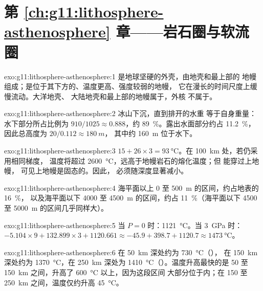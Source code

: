 \section*{第 \ref{ch:g11:lithosphere-asthenosphere} 章——岩石圈与软流圈}

\begin{solution}{exo:g11:lithosphere-asthenosphere:1}
是地球坚硬的外壳，由地壳和最上部的
地幔组成；是位于其下方的、温度更高、强度较弱的地幔，
它在漫长的时间尺度上缓慢流动。大洋地壳、
大陆地壳和最上部的地幔属于，外核
不属于。
\end{solution}

\begin{solution}{exo:g11:lithosphere-asthenosphere:2}
冰山下沉，直到排开的水重
等于自身重量：水下部分所占比例为
$910/1025 \approx 0.888$，约 \qty{89}{\percent}。露出水面部分约占
\qty{11.2}{\percent}，因此总高度为 $20/0.112 \approx \qty{180}{m}$，
其中约 \qty{160}{m} 位于水下。
\end{solution}

\begin{solution}{exo:g11:lithosphere-asthenosphere:3}
$15 + 26 \times 3 = \qty{93}{\celsius}$。在 \qty{100}{km} 处，若仍采用相同梯度，
温度将超过 \qty{2600}{\celsius}，远高于地幔岩石的熔化温度；但 能穿过上地幔，
可见上地幔是固态的。因此，
必须随深度显著减小。
\end{solution}

\begin{solution}{exo:g11:lithosphere-asthenosphere:4}
海平面以上 0 至 \qty{500}{m} 的区间，约占地表的 \qty{16}{\percent}，
以及海平面以下 4000 至 \qty{4500}{m} 的区间，约占
\qty{11}{\percent}（海平面以下 4500 至 \qty{5000}{m}
的区间几乎同样大）。
\end{solution}

\begin{solution}{exo:g11:lithosphere-asthenosphere:5}
当 $P = 0$ 时：\qty{1121}{\celsius}。当 \qty{3}{GPa} 时：$-5.104 \times 9 +
132.899 \times 3 + 1120.661 \approx -45.9 + 398.7 + 1120.7 \approx
\qty{1473}{\celsius}$。
\end{solution}

\begin{solution}{exo:g11:lithosphere-asthenosphere:6}
在 \qty{50}{km} 深处约为 \qty{730}{\celsius}（），
在 \qty{150}{km} 深处约为 \qty{1370}{\celsius}，在 \qty{250}{km}
深处为 \qty{1410}{\celsius}（）。温度升高最快的是
50 至 \qty{150}{km} 之间，升高了 \qty{600}{\celsius} 以上，因为这段区间
大部分位于内；在 150 至 \qty{250}{km} 之间，温度仅约升高
\qty{45}{\celsius}。
\end{solution}

